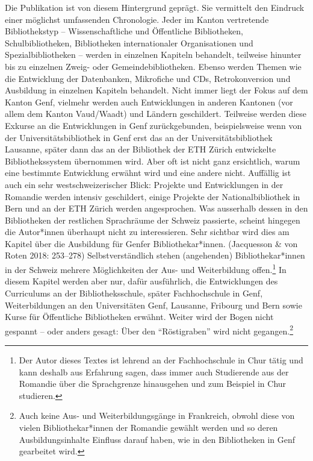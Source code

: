 \documentclass[a4paper,
fontsize=11pt,
oneside,
numbers=noperiodatend,
parskip=half-,
bibliography=totoc,
final
]{scrartcl}
\begin{document}
Die Publikation ist von diesem Hintergrund geprägt. Sie vermittelt den
Eindruck einer möglichst umfassenden Chronologie. Jeder im Kanton
vertretende Bibliothekstyp -- Wissenschaftliche und Öffentliche
Bibliotheken, Schulbibliotheken, Bibliotheken internationaler
Organisationen und Spezialbibliotheken -- werden in einzelnen Kapiteln
behandelt, teilweise hinunter bis zu einzelnen Zweig- oder
Gemeindebibliotheken. Ebenso werden Themen wie die Entwicklung der
Datenbanken, Mikrofiche und CDs, Retrokonversion und Ausbildung in
einzelnen Kapiteln behandelt. Nicht immer liegt der Fokus auf dem Kanton
Genf, vielmehr werden auch Entwicklungen in anderen Kantonen (vor allem
dem Kanton Vaud/Waadt) und Ländern geschildert. Teilweise werden diese
Exkurse an die Entwicklungen in Genf zurückgebunden, beispielsweise wenn
von der Universitätsbibliothek in Genf erst das an der
Universitätsbibliothek Lausanne, später dann das an der Bibliothek der
ETH Zürich entwickelte Bibliothekssystem übernommen wird. Aber oft ist
nicht ganz ersichtlich, warum eine bestimmte Entwicklung erwähnt wird
und eine andere nicht. Auffällig ist auch ein sehr westschweizerischer
Blick: Projekte und Entwicklungen in der Romandie werden intensiv
geschildert, einige Projekte der Nationalbibliothek in Bern und an der
ETH Zürich werden angesprochen. Was ausserhalb dessen in den
Bibliotheken der restlichen Sprachräume der Schweiz passierte, scheint
hingegen die Autor*innen überhaupt nicht zu interessieren. Sehr sichtbar
wird dies am Kapitel über die Ausbildung für Genfer Bibliothekar*innen.
(Jacquesson \& von Roten 2018: 253--278) Selbstverständlich stehen
(angehenden) Bibliothekar*innen in der Schweiz mehrere Möglichkeiten der
Aus- und Weiterbildung offen.\footnote{Der Autor dieses Textes ist
  lehrend an der Fachhochschule in Chur tätig und kann deshalb aus
  Erfahrung sagen, dass immer auch Studierende aus der Romandie über
  die Sprachgrenze hinausgehen und zum Beispiel in Chur studieren.} In
diesem Kapitel werden aber nur, dafür ausführlich, die Entwicklungen des
Curriculums an der Bibliotheksschule, später Fachhochschule in Genf,
Weiterbildungen an den Universitäten Genf, Lausanne, Fribourg und Bern
sowie Kurse für Öffentliche Bibliotheken erwähnt. Weiter wird der Bogen
nicht gespannt -- oder anders gesagt: Über den \enquote{Röstigraben} wird nicht
gegangen.\footnote{Auch keine Aus- und Weiterbildungsgänge in
  Frankreich, obwohl diese von vielen Bibliothekar*innen der Romandie
  gewählt werden und so deren Ausbildungsinhalte Einfluss darauf haben,
  wie in den Bibliotheken in Genf gearbeitet wird.}
\end{document}
